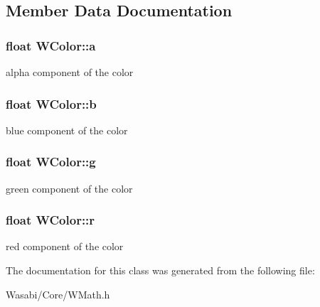 \subsection{Member Data Documentation}
\subsubsection[{\texorpdfstring{a}{a}}]{\setlength{\rightskip}{0pt plus 5cm}float W\+Color\+::a}\hypertarget{class_w_color_add453fb03a2f570d04d20458f166b9e0}{}\label{class_w_color_add453fb03a2f570d04d20458f166b9e0}
alpha component of the color 
\subsubsection[{\texorpdfstring{b}{b}}]{\setlength{\rightskip}{0pt plus 5cm}float W\+Color\+::b}\hypertarget{class_w_color_a740e9174ff78cba98a391f6e5b319192}{}\label{class_w_color_a740e9174ff78cba98a391f6e5b319192}
blue component of the color 
\subsubsection[{\texorpdfstring{g}{g}}]{\setlength{\rightskip}{0pt plus 5cm}float W\+Color\+::g}\hypertarget{class_w_color_aea6616f49cdb611d9a519787a692ce31}{}\label{class_w_color_aea6616f49cdb611d9a519787a692ce31}
green component of the color 
\subsubsection[{\texorpdfstring{r}{r}}]{\setlength{\rightskip}{0pt plus 5cm}float W\+Color\+::r}\hypertarget{class_w_color_a0bdf6acf580fb1607bed90cb01596444}{}\label{class_w_color_a0bdf6acf580fb1607bed90cb01596444}
red component of the color 

The documentation for this class was generated from the following file\+:\begin{DoxyCompactItemize}
\item 
Wasabi/\+Core/W\+Math.\+h\end{DoxyCompactItemize}
